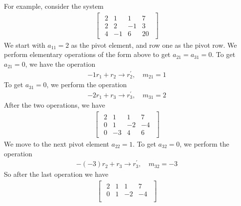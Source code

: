 \documentclass{report}
\begin{document}
\begin{itemize}
        \bigbreak \noindent 
        For example, consider the system
        \begin{align*}
            \begin{bmatrix}
                \begin{array}{ccc|c}
                    2 & 1 & 1 & 7 \\
                    2 & 2 & -1 & 3 \\
                    4 & -1 & 6 & 20
               \end{array}
            \end{bmatrix}
        \end{align*}
        We start with $a_{11} = 2$ as the pivot element, and row one as the pivot row. We perform elementary operations of the form above to get $a_{21} = a_{31} = 0$. To get $a_{21} = 0$, we have the operation
        \begin{align*}
            -1r_{1} + r_{2} \to r_{2}^{\prime}, \quad m_{21} = 1
        \end{align*}
        To get $a_{31} = 0$, we perform the operation
        \begin{align*}
            -2r_{1} + r_{3} \to r_{3}^{\prime}, \quad m_{31} = 2
        \end{align*}
        After the two operations, we have
        \begin{align*}
            \begin{bmatrix}
                \begin{array}{ccc|c}
                    2 & 1 & 1 & 7 \\
                    0 & 1 & -2 & -4 \\
                    0 & -3 & 4 & 6
                \end{array}
            \end{bmatrix}
        \end{align*}
        We move to the next pivot element $a_{22} = 1$. To get $a_{32} = 0$, we perform the operation
        \begin{align*}
            -(-3)r_{2} + r_{3} \to r_{3}^{\prime},\quad m_{32} = -3
        \end{align*}
        So after the last operation we have
        \begin{align*}
            \begin{bmatrix}
                \begin{array}{ccc|c}
                    2 & 1 & 1 & 7 \\
                    0 & 1 & -2 & -4 \\

\end{array}
\end{bmatrix}
\end{align*}
\end{itemize}
\end{document}
